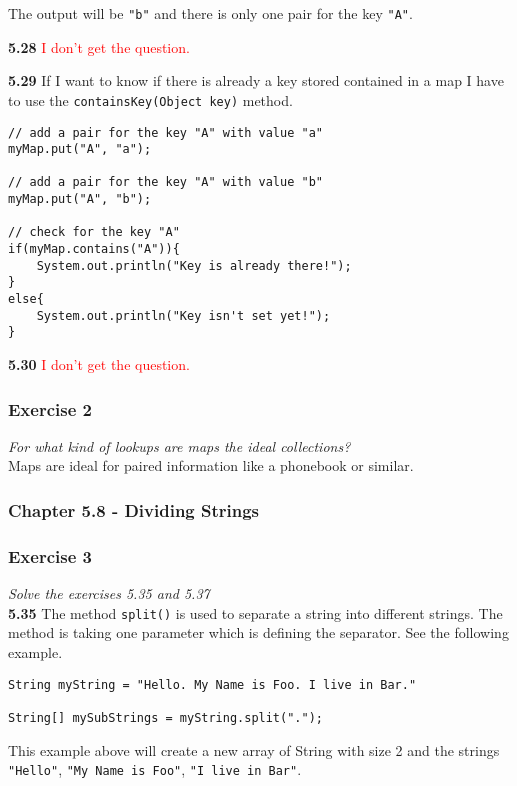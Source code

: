 The output will be \lstinline{"b"} and there is only one pair for 
the key \lstinline{"A"}.

\textbf{5.28} \textcolor{red}{I don't get the question.}

\textbf{5.29} If I want to know if there is already a key stored contained
in a map I have to use the \lstinline{containsKey(Object key)} method.

\begin{lstlisting}
// add a pair for the key "A" with value "a"
myMap.put("A", "a");

// add a pair for the key "A" with value "b"
myMap.put("A", "b");

// check for the key "A"
if(myMap.contains("A")){
	System.out.println("Key is already there!");
}
else{
	System.out.println("Key isn't set yet!");
}
\end{lstlisting}

\textbf{5.30} \textcolor{red}{I don't get the question.}

\subsubsection*{Exercise 2}
\textit{For what kind of lookups are maps the ideal collections?} \\
Maps are ideal for paired information like a phonebook or similar.

\subsubsection{Chapter 5.8 - Dividing Strings}

\subsubsection*{Exercise 3}
\textit{Solve the exercises 5.35 and 5.37} \\

\textbf{5.35} The method \lstinline{split()} is used to separate a string
into different strings. The method is taking one parameter which is defining
the separator. See the following example.

\begin{lstlisting}
String myString = "Hello. My Name is Foo. I live in Bar."

String[] mySubStrings = myString.split(".");
\end{lstlisting}

This example above will create a new array of String with size 2 and the 
strings 
\lstinline{"Hello"}, \lstinline{"My Name is Foo"}, \lstinline{"I live in Bar"}.

